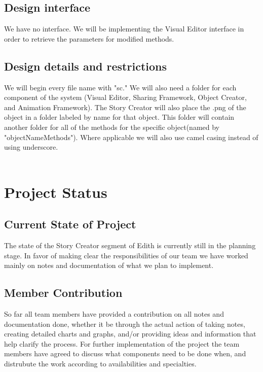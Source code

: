 \documentclass[12pt]{article}
\begin{document}
\subsection{Design interface}
We have no interface.  We will be implementing the Visual Editor interface in order to retrieve the parameters for modified methods.

\subsection{Design details and restrictions}
We will begin every file name with "sc."  We will also need a folder for each component of the system (Visual Editor, Sharing Framework, Object Creator, and Animation Framework).  The Story Creator will also place the .png of the object in a folder labeled by name for that object.  This folder will contain another folder for all of the methods for the specific object(named by "objectNameMethods").  Where applicable we will also use camel casing instead of using underscore. \\ \\


\section{Project Status} 
\subsection{Current State of Project}
The state of the Story Creator segment of Edith is currently still in the planning stage. In favor of making clear the responsibilities of our team we have worked mainly on notes and documentation of what we plan to implement.

\subsection{Member Contribution}
So far all team members have provided a contribution on all notes and documentation done, whether it be through the actual action of taking notes, creating detailed charts and graphs, and/or providing ideas and information that help clarify the process. For further implementation of the project the team members have agreed to discuss what components need to be done when, and distrubute the work according to availabilities and specialties.
\end{document}
